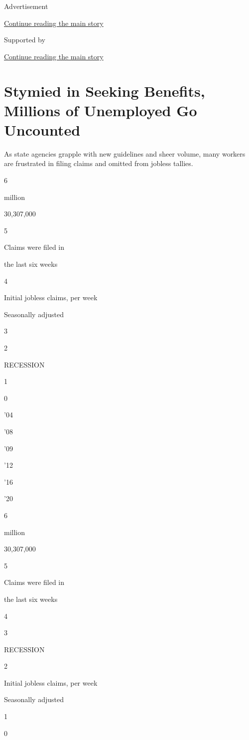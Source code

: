 Advertisement

\protect\hyperlink{after-top}{Continue reading the main story}

Supported by

\protect\hyperlink{after-sponsor}{Continue reading the main story}

\hypertarget{stymied-in-seeking-benefits-millions-of-unemployed-go-uncounted}{%
\section{Stymied in Seeking Benefits, Millions of Unemployed Go
Uncounted}\label{stymied-in-seeking-benefits-millions-of-unemployed-go-uncounted}}

As state agencies grapple with new guidelines and sheer volume, many
workers are frustrated in filing claims and omitted from jobless
tallies.

6

million

30,307,000

5

Claims were filed in

the last six weeks

4

Initial jobless claims, per week

Seasonally adjusted

3

2

RECESSION

1

0

'04

'08

'09

'12

'16

'20

6

million

30,307,000

5

Claims were filed in

the last six weeks

4

3

RECESSION

2

Initial jobless claims, per week

Seasonally adjusted

1

0

